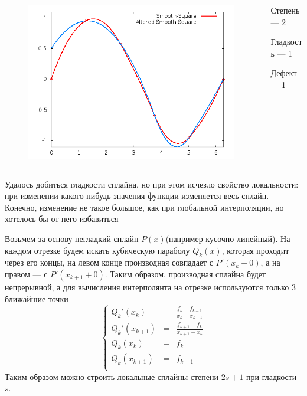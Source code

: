 \documentclass[professionalfonts,compress,unicode]{beamer}
\begin{document}
{
	
	\begin{columns}[c]
	\begin{column}{0.6\textwidth}
	\begin{figure}
	\center
	\includegraphics[width=\textwidth]{spline2_1.png}%
	\end{figure}
	\end{column}
	\begin{column}{0.4\textwidth}
	Степень --- 2
	
	Гладкость --- 1
	
	Дефект --- 1
	\end{column}
	\end{columns}
	
	Удалось добиться гладкости сплайна, но при этом исчезло свойство локальности:
	при изменении какого-нибудь значения функции изменяется весь сплайн. Конечно, изменение не такое 
	большое, как при глобальной интерполяции, но хотелось бы от него избавиться
}

{
	Возьмем за основу негладкий сплайн $P(x)$(например кусочно-линейный). 
	На каждом отрезке будем искать кубическую параболу $Q_k(x)$, которая проходит через его концы,
	на левом конце производная совпадает с $P'(x_k+0)$, а на правом --- с $P'(x_{k+1}+0)$. 
	Таким образом, производная сплайна будет непрерывной, а для вычисления интерполянта на отрезке используются только 
	3 ближайшие точки
	$$
	\left\{
	\begin{array}{lcl}
		Q_k'(x_k) &=& \frac{f_{k}-f_{k-1}}{x_k-x_{k-1}}\\
		Q_k'(x_{k+1}) &=& \frac{f_{k+1}-f_{k}}{x_{k+1}-x_{k}}\\
		Q_k(x_k) &=& f_k\\
		Q_k(x_{k+1}) &=& f_{k+1}\\
	\end{array}
	\right.
	$$
	Таким образом можно строить локальные сплайны степени $2s+1$ при гладкости $s$.
}
\end{document}
